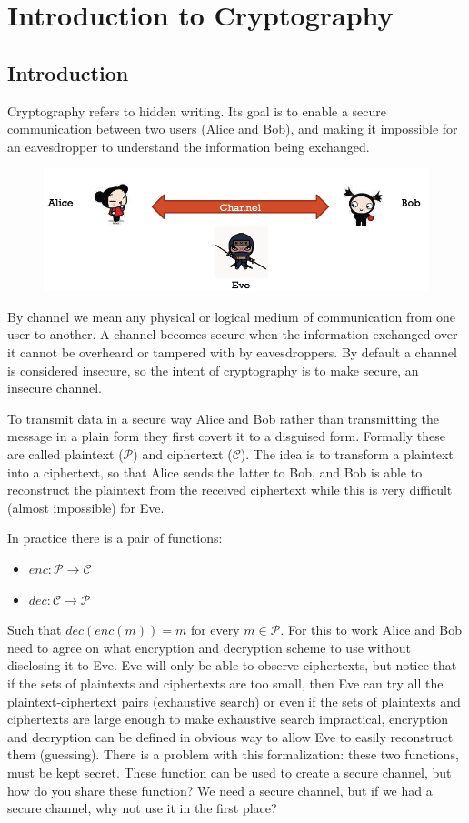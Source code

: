 \chapter{Introduction to Cryptography}

\section{Introduction}
Cryptography refers to hidden writing. Its goal is to enable a secure communication between two users (Alice and Bob), and making it impossible for an eavesdropper to understand the information being exchanged.

\begin{figure}
	\centering
	\includegraphics[width=0.7\linewidth]{Images/Chapter1/screenshot000}
	\caption{}
	\label{fig:chapter1_screenshot000}
\end{figure}

By channel we mean any physical or logical medium of communication from one user to another. A channel becomes secure when the information exchanged over it cannot be overheard or tampered with by eavesdroppers. By default a channel is considered insecure, so the intent of cryptography is to make secure, an insecure channel.

To transmit data in a secure way Alice and Bob rather than transmitting the message in a plain form they first covert it to a disguised form. Formally these are called plaintext ($\mathcal{P}$) and ciphertext ($\mathcal{C}$). The idea is to transform a plaintext into a ciphertext, so that Alice sends the latter to Bob, and Bob is able to reconstruct the plaintext from the received ciphertext while this is very difficult (almost impossible) for Eve.

In practice there is a pair of functions:
\begin{itemize}
	\item $enc: \mathcal{P \rightarrow C}$
	\item $dec: \mathcal{C \rightarrow P}$
\end{itemize}
Such that $dec(enc(m)) = m$ for every $m\in\mathcal{P}$.
For this to work Alice and Bob need to agree on what encryption and decryption scheme to use without disclosing it to Eve. Eve will only be able to observe ciphertexts, but notice that if the sets of plaintexts and ciphertexts are too small, then Eve can try all the plaintext-ciphertext pairs (exhaustive search) or even if the sets of plaintexts and ciphertexts are large enough to make exhaustive search impractical, encryption and decryption can be defined in obvious way to allow Eve to easily reconstruct them (guessing).
There is a problem with this formalization: these two functions, must be kept secret. These function can be used to create a secure channel, but how do you share these function? We need a secure channel, but if we had a secure channel, why not use it in the first place?

